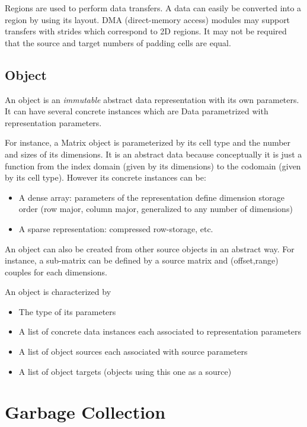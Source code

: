 \documentclass[twocolumn]{article}
\begin{document}
Regions are used to perform data transfers. A data can easily be converted into
a region by using its layout. DMA (direct-memory access) modules may support
transfers with strides which correspond to 2D regions. It may not be required
that the source and target numbers of padding cells are equal.

\subsection{Object}

An object is an \emph{immutable} abstract data representation with its own
parameters. It can have several concrete instances which are Data parametrized
with representation parameters.

For instance, a Matrix object is parameterized by its cell type and
the number and sizes of its dimensions. It is an abstract data because
conceptually it is just a function from the index domain (given by its
dimensions) to the codomain (given by its cell type). However its concrete
instances can be: 
\begin{itemize}
   \item A dense array: parameters of the representation define
dimension storage order (row major, column major, generalized to any number of
dimensions)
   \item A sparse representation: compressed row-storage, etc.
\end{itemize}

An object can also be created from other source objects in an abstract way. For
instance, a sub-matrix can be defined by a source matrix and (offset,range)
couples for each dimensions.

\begin{defin}
An object is characterized by
\begin{itemize}
   \item The type of its parameters
   \item A list of concrete data instances each associated to representation parameters
   \item A list of object sources each associated with source parameters
   \item A list of object targets (objects using this one as a source)
\end{itemize}
\end{defin}


\section{Garbage Collection}
\end{document}
